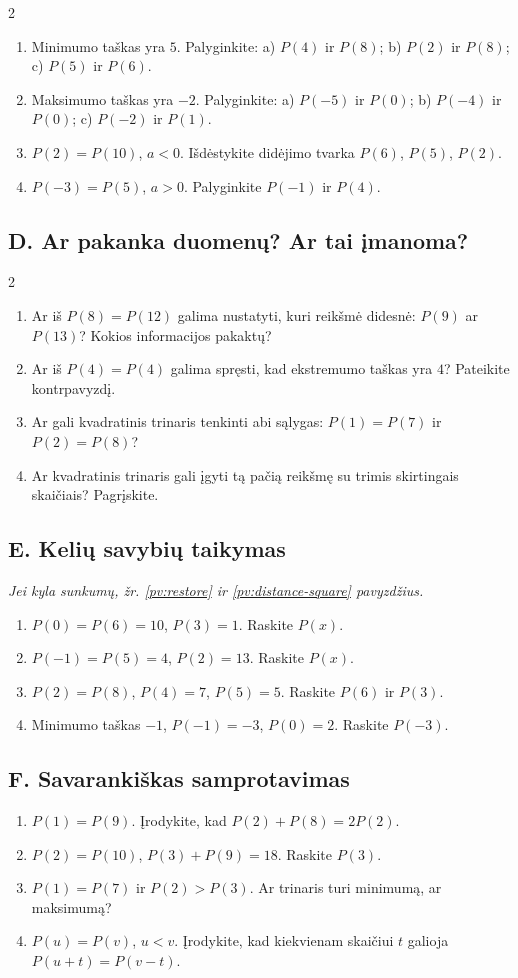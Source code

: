 \documentclass[11pt,a4paper]{scrartcl}
\newcommand{\hint}[1]{{\small\itshape Jei kyla sunkumų, žr. #1 pavyzdžius.}\par}
\begin{document}
\begin{multicols}{2}
\begin{enumerate}[start=13]
\item Minimumo taškas yra $5$. Palyginkite: a) $P(4)$ ir $P(8)$; b) $P(2)$ ir $P(8)$; c) $P(5)$ ir $P(6)$.
\item Maksimumo taškas yra $-2$. Palyginkite: a) $P(-5)$ ir $P(0)$; b) $P(-4)$ ir $P(0)$; c) $P(-2)$ ir $P(1)$.
\item $P(2)=P(10)$, $a<0$. Išdėstykite didėjimo tvarka $P(6)$, $P(5)$, $P(2)$.
\item $P(-3)=P(5)$, $a>0$. Palyginkite $P(-1)$ ir $P(4)$.
\end{enumerate}\end{multicols}\subsection*{D. Ar pakanka duomenų? Ar tai įmanoma?}\begin{multicols}{2}\begin{enumerate}[start=17]
\item Ar iš $P(8)=P(12)$ galima nustatyti, kuri reikšmė didesnė: $P(9)$ ar $P(13)$? Kokios informacijos pakaktų?
\item Ar iš $P(4)=P(4)$ galima spręsti, kad ekstremumo taškas yra $4$? Pateikite kontrpavyzdį.
\item Ar gali kvadratinis trinaris tenkinti abi sąlygas: $P(1)=P(7)$ ir $P(2)=P(8)$?
\item Ar kvadratinis trinaris gali įgyti tą pačią reikšmę su trimis skirtingais skaičiais? Pagrįskite.
\end{enumerate}\end{multicols}\newpage\subsection*{E. Kelių savybių taikymas}\hint{\ref{pv:restore} ir \ref{pv:distance-square}}\begin{enumerate}[start=21]
\item $P(0)=P(6)=10$, $P(3)=1$. Raskite $P(x)$.
\item $P(-1)=P(5)=4$, $P(2)=13$. Raskite $P(x)$.
\item $P(2)=P(8)$, $P(4)=7$, $P(5)=5$. Raskite $P(6)$ ir $P(3)$.
\item Minimumo taškas $-1$, $P(-1)=-3$, $P(0)=2$. Raskite $P(-3)$.
\end{enumerate}\subsection*{F. Savarankiškas samprotavimas}\begin{enumerate}[start=25]
\item $P(1)=P(9)$. Įrodykite, kad $P(2)+P(8)=2P(2)$.
\item $P(2)=P(10)$, $P(3)+P(9)=18$. Raskite $P(3)$.
\item $P(1)=P(7)$ ir $P(2)>P(3)$. Ar trinaris turi minimumą, ar maksimumą?
\item $P(u)=P(v)$, $u<v$. Įrodykite, kad kiekvienam skaičiui $t$ galioja $P(u+t)=P(v-t)$.
\end{enumerate}
\end{document}
